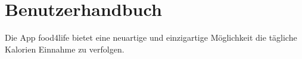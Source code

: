 \section{Benutzerhandbuch}
\label{concept}

Die App food4life bietet eine neuartige und einzigartige Möglichkeit die tägliche Kalorien Einnahme zu verfolgen.
